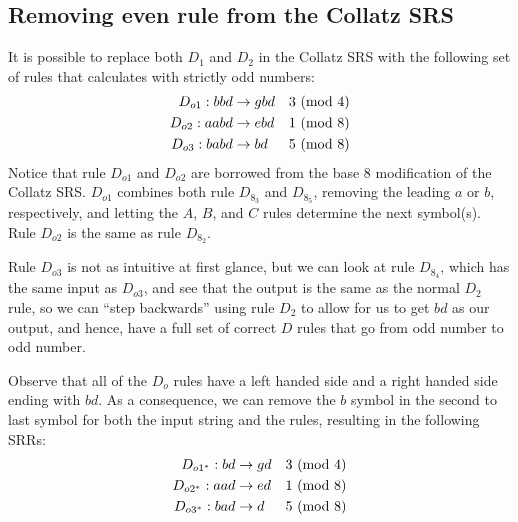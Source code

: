 \subsection{Removing even rule from the Collatz SRS}\label{subsubsec:evenruleremove}
It is possible to replace both $D_1$ and $D_2$ in the Collatz SRS with the following set of rules that calculates with strictly odd numbers:
\begin{align*}
    D_{o1}: bbd &\rightarrow gbd &\text{$3\ (\mathrm{mod}\ 4)$}\\
    D_{o2}: aabd &\rightarrow ebd &\text{$1\ (\mathrm{mod}\ 8)$}\\
    D_{o3}: babd &\rightarrow bd &\text{$5\ (\mathrm{mod}\ 8)$}
\end{align*}
Notice that rule $D_{o1}$ and $D_{o2}$ are borrowed from the base 8 modification of the Collatz SRS. $D_{o1}$ combines both rule $D_{8_3}$ and $D_{8_5}$, removing the leading $a$ or $b$, respectively, and letting the $A$, $B$, and $C$ rules determine the next symbol(s). Rule $D_{o2}$ is the same as rule $D_{8_2}$.\par
Rule $D_{o3}$ is not as intuitive at first glance, but we can look at rule $D_{8_4}$, which has the same input as $D_{o3}$, and see that the output is the same as the normal $D_2$ rule, so we can ``step backwards'' using rule $D_2$ to allow for us to get $bd$ as our output, and hence, have a full set of correct $D$ rules that go from odd number to odd number.\par
Observe that all of the $D_o$ rules have a left handed side and a right handed side ending with $bd$. As a consequence, we can remove the $b$ symbol in the second to last symbol for both the input string and the rules, resulting in the following SRRs:
\begin{align*}
    D_{o1^*}: bd &\rightarrow gd &\text{$3\ (\mathrm{mod}\ 4)$}\\
    D_{o2^*}: aad &\rightarrow ed &\text{$1\ (\mathrm{mod}\ 8)$}\\
    D_{o3^*}: bad &\rightarrow d &\text{$5\ (\mathrm{mod}\ 8)$}
\end{align*}
